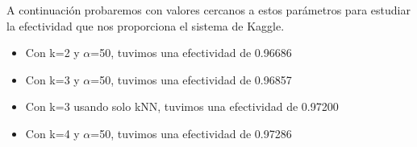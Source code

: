 A continuación probaremos con valores cercanos a estos parámetros para estudiar la efectividad que nos proporciona el sistema de Kaggle.
\begin{itemize}
	\item Con k=2 y $\alpha$=50, tuvimos una efectividad de 0.96686
	\item Con k=3 y $\alpha$=50, tuvimos una efectividad de 0.96857
	\item Con k=3 usando solo kNN, tuvimos una efectividad de 0.97200
	\item Con k=4 y $\alpha$=50, tuvimos una efectividad de 0.97286
\end{itemize}